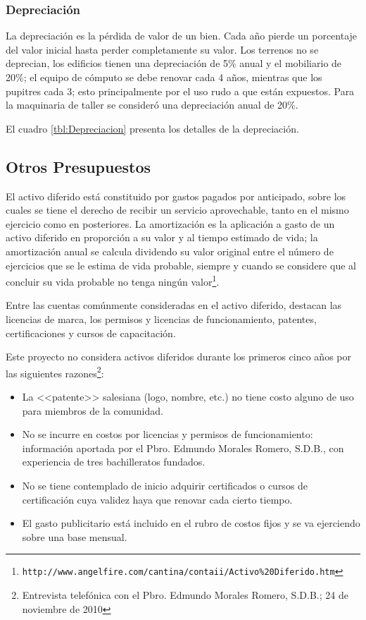 \subsubsection{Depreciación}

La depreciación es la pérdida de valor de un bien. Cada año pierde un porcentaje del valor inicial hasta perder completamente su valor. Los terrenos no se deprecian, los edificios tienen una depreciación de 5\% anual y el mobiliario de 20\%; el equipo de cómputo se debe renovar cada 4 años, mientras que los pupitres cada 3; esto principalmente por el uso rudo a que están expuestos. Para la maquinaria de taller se consideró una depreciación anual de 20\%.

El cuadro \ref{tbl:Depreciacion} presenta los detalles de la depreciación.



\subsection{Otros Presupuestos}
\label{sub:Otros:Presupuestos}


El activo diferido está constituido por gastos pagados por anticipado, sobre los cuales se tiene el derecho de recibir un servicio aprovechable, tanto en el mismo ejercicio como en posteriores. La amortización es la aplicación a gasto de un activo diferido en proporción a su valor y al tiempo estimado de vida; la amortización anual se calcula dividendo su valor original entre el número de ejercicios que se le estima de vida probable, siempre y cuando se considere que al concluir su vida probable no tenga ningún valor\footnote{\texttt{http://www.angelfire.com/cantina/contaii/Activo\%20Diferido.htm}}.%

Entre las cuentas comúnmente consideradas en el activo diferido, destacan las licencias de marca, los permisos y licencias de funcionamiento, patentes, certificaciones y cursos de capacitación.

Este proyecto no considera activos diferidos durante los primeros cinco años por las siguientes razones\footnote{Entrevista telefónica con el Pbro. Edmundo Morales Romero, S.D.B.; 24 de noviembre de 2010}:

\begin{itemize}
	\item La <<patente>> salesiana (logo, nombre, etc.) no tiene costo alguno de uso para miembros de la comunidad.
	\item No se incurre en costos por licencias y permisos de funcionamiento: información aportada por el Pbro. Edmundo Morales Romero, S.D.B., con experiencia de tres bachilleratos fundados.
	\item No se tiene contemplado de inicio adquirir certificados o cursos de certificación cuya validez haya que renovar cada cierto tiempo.
	\item El gasto publicitario está incluido en el rubro de costos fijos y se va ejerciendo sobre una base mensual.
\end{itemize}

